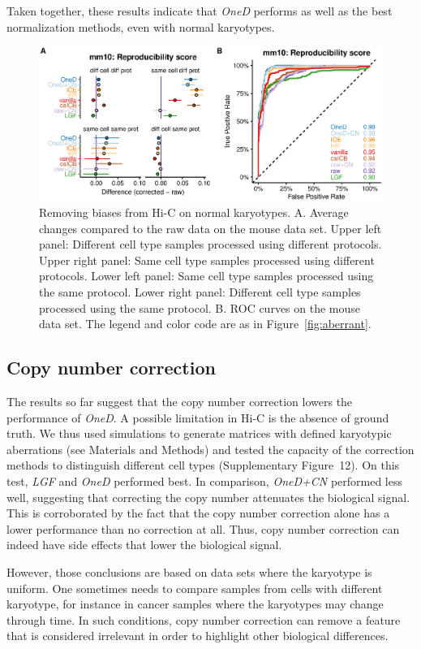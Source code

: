\documentclass[a4,center,fleqn]{NAR}
\begin{document}
Taken together, these results indicate that \textit{OneD} performs as well
as the best normalization methods, even with normal karyotypes.

\begin{figure}
\centerline{\includegraphics[width=.49\textwidth]
  {nar_figures/figure_3.eps}}
\caption{Removing biases from Hi-C on normal karyotypes. A. Average
  changes compared to the raw data on the mouse data set.
  Upper left panel: Different cell type samples
processed using different protocols. Upper right panel: Same cell
type samples processed using different protocols. Lower left panel:
Same cell type samples processed using the same protocol. Lower right panel:
Different cell type samples processed using the same protocol. B. ROC curves on
the mouse data set. The legend and color code are as in Figure~\ref{fig:aberrant}.}
\label{fig:normal}
\end{figure}


\subsection{Copy number correction}

The results so far suggest that the copy number correction lowers the
performance of \textit{OneD}. A possible limitation in Hi-C is the absence
of ground truth. We thus used simulations to generate matrices with
defined karyotypic aberrations (see Materials and Methods) and tested the
capacity of the correction methods to distinguish different cell types
(Supplementary Figure~12). On this test, \textit{LGF} and \textit{OneD}
performed best. In comparison, \textit{OneD+CN} performed less well,
suggesting that correcting the copy number attenuates the biological
signal. This is corroborated by the fact that the copy number correction
alone has a lower performance than no correction at all. Thus, copy number
correction can indeed have side effects that lower the biological signal.

However, those conclusions are based on data sets where the karyotype is
uniform. One sometimes needs to compare samples from cells with different
karyotype, for instance in cancer samples where the karyotypes may change
through time. In such conditions, copy number correction can remove a
feature that is considered irrelevant in order to highlight other
biological differences.
\end{document}
